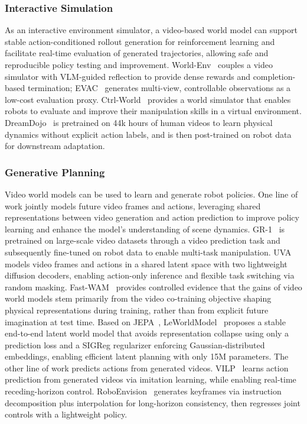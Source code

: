 \documentclass[lettersize,journal]{IEEEtran}
\begin{document}
\subsubsection{Interactive Simulation}
As an interactive environment simulator, a video-based world model can support stable action-conditioned rollout generation for reinforcement learning and facilitate real-time evaluation of generated trajectories, allowing safe and reproducible policy testing and improvement. World-Env~\cite{xiao2025world} couples a video simulator with VLM-guided reflection to provide dense rewards and completion-based termination; EVAC~\cite{jiang2025enerverse} generates multi-view, controllable observations as a low-cost evaluation proxy. Ctrl-World~\cite{guo2025ctrl} provides a world simulator that enables robots to evaluate and improve their manipulation skills in a virtual environment. DreamDojo~\cite{gao2026dreamdojogeneralistrobotworld} is pretrained on 44k hours of human videos to learn physical dynamics without explicit action labels, and is then post-trained on robot data for downstream adaptation.

\subsubsection{Generative Planning}
Video world models can be used to learn and generate robot policies. One line of work jointly models future video frames and actions, leveraging shared representations between video generation and action prediction to improve policy learning and enhance the model's understanding of scene dynamics. GR-1~\cite{wu2023unleashing} is pretrained on large-scale video datasets through a video prediction task and subsequently fine-tuned on robot data to enable multi-task manipulation. UVA~\cite{li2025unified} models video frames and actions in a shared latent space with two lightweight diffusion decoders, enabling action-only inference and flexible task switching via random masking. Fast-WAM~\cite{yuan2026fastwam} provides controlled evidence that the gains of video world models stem primarily from the video co-training objective shaping physical representations during training, rather than from explicit future imagination at test time. Based on JEPA~\cite{lecun2022path}, LeWorldModel~\cite{maes2026leworldmodel} proposes a stable end-to-end latent world model that avoids representation collapse using only a prediction loss and a SIGReg regularizer enforcing Gaussian-distributed embeddings, enabling efficient latent planning with only 15M parameters. The other line of work predicts actions from generated videos. VILP~\cite{xu2025vilp} learns action prediction from generated videos via imitation learning, while enabling real-time receding-horizon control. RoboEnvision~\cite{yang2025roboenvision} generates keyframes via instruction decomposition plus interpolation for long-horizon consistency, then regresses joint controls with a lightweight policy. 
\end{document}
